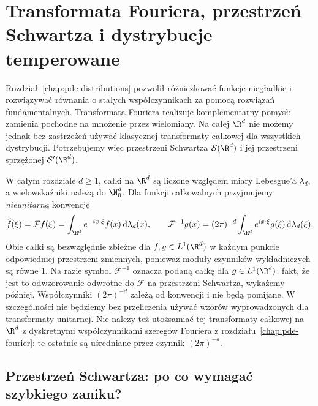 \chapter[Transformata Fouriera i dystrybucje temperowane]{Transformata Fouriera, przestrzeń Schwartza i dystrybucje temperowane}
\label{chap:pde-fourier-Rd}

\providecommand{\atlasref}[2]{#2}

Rozdział~\ref{chap:pde-distributions} pozwolił różniczkować funkcje
niegładkie i rozwiązywać równania o stałych współczynnikach za pomocą
rozwiązań fundamentalnych. Transformata Fouriera realizuje komplementarny
pomysł: zamienia pochodne na mnożenie przez wielomiany. Na całej
$\R^d$ nie możemy jednak bez zastrzeżeń używać klasycznej transformaty
całkowej dla wszystkich dystrybucji. Potrzebujemy więc przestrzeni
Schwartza $\mathcal S(\R^d)$ i jej przestrzeni sprzężonej $\mathcal S'(\R^d)$.

W całym rozdziale $d\ge1$, całki na $\R^d$ są liczone względem
miary Lebesgue'a $\lambda_d$, a wielowskaźniki należą do $\N_0^d$.
Dla funkcji całkowalnych przyjmujemy \emph{nieunitarną}
konwencję
\begin{equation}\label{eq:pde8-convention}
 \widehat f(\xi)=\mathcal F f(\xi)
 =\int_{\R^d}e^{-ix\cdot\xi}f(x)\,\mathrm d\lambda_d(x),\qquad
 \mathcal F^{-1}g(x)=(2\pi)^{-d}
 \int_{\R^d}e^{ix\cdot\xi}g(\xi)\,\mathrm d\lambda_d(\xi).
\end{equation}
Obie całki są bezwzględnie zbieżne dla
$f,g\in L^1(\R^d)$ w każdym punkcie odpowiedniej
przestrzeni zmiennych, ponieważ moduły czynników
wykładniczych są równe $1$. Na razie symbol
$\mathcal F^{-1}$ oznacza podaną całkę
dla $g\in L^1(\R^d)$; fakt, że jest to odwzorowanie
odwrotne do $\mathcal F$ na przestrzeni Schwartza,
wykażemy później.
Współczynniki $(2\pi)^{-d}$ zależą od konwencji i nie będą
pomijane. W szczególności nie będziemy bez przeliczenia używać
wzorów wyprowadzonych dla transformaty unitarnej.
Nie należy też utożsamiać tej transformaty całkowej na $\R^d$
z dyskretnymi współczynnikami szeregów Fouriera z
rozdziału~\ref{chap:pde-fourier}: te ostatnie są uśredniane
przez czynnik $(2\pi)^{-d}$.

\section{Przestrzeń Schwartza: po co wymagać szybkiego zaniku?}
\label{sec:pde8-schwartz}

